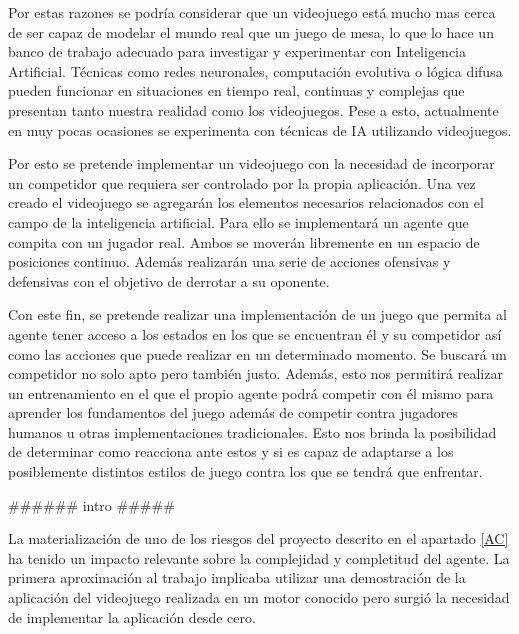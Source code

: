 \bigskip

Por estas razones se podría considerar que un videojuego está mucho mas cerca de ser capaz de modelar el mundo real que un juego de mesa, lo que lo hace un banco de trabajo adecuado para investigar y experimentar con Inteligencia Artificial. Técnicas como redes neuronales, computación evolutiva o lógica difusa pueden funcionar en situaciones en tiempo real, continuas y complejas que presentan tanto nuestra realidad como los videojuegos. Pese a esto, actualmente en muy pocas ocasiones se experimenta con técnicas de IA utilizando videojuegos.

\bigskip

Por esto se pretende implementar un videojuego con la necesidad de incorporar un competidor que requiera ser controlado por la propia aplicación. Una vez creado el videojuego se agregarán los elementos necesarios relacionados con el campo de la inteligencia artificial. Para ello se implementará un agente que compita con un jugador real. Ambos se moverán libremente en un espacio de posiciones continuo. Además realizarán una serie de acciones ofensivas y defensivas con el objetivo de derrotar a su oponente.

\bigskip

Con este fin, se pretende realizar una implementación de un juego que permita al agente tener acceso a los estados en los que se encuentran él y su competidor así como las acciones que puede realizar en un determinado momento. Se buscará un competidor no solo apto pero también justo. Además, esto nos permitirá realizar un entrenamiento en el que el propio agente podrá competir con él mismo para aprender los fundamentos del juego además de competir contra jugadores humanos u otras implementaciones tradicionales. Esto nos brinda la posibilidad de determinar como reacciona ante estos y si es capaz de adaptarse a los posiblemente distintos estilos de juego contra los que se tendrá que enfrentar.






###### intro #####


\bigskip

La materialización de uno de los riesgos del proyecto descrito en el apartado \ref{AC} ha tenido un impacto relevante sobre la complejidad y completitud del agente. La primera aproximación al trabajo implicaba utilizar una demostración de la aplicación del videojuego realizada en un motor conocido pero surgió la necesidad de implementar la aplicación desde cero.

